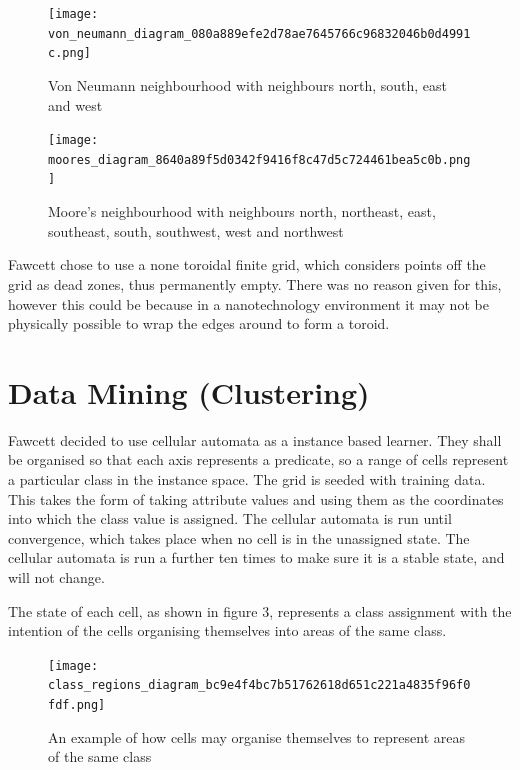 \documentclass[11pt]{article}
\begin{document}
\begin{figure}[htb]
\centering
\texttt{[image: von\_neumann\_diagram\_080a889efe2d78ae7645766c96832046b0d4991c.png]}
\caption{Von Neumann neighbourhood with neighbours north, south, east and west}
\end{figure}


\begin{figure}[htb]
\centering
\texttt{[image: moores\_diagram\_8640a89f5d0342f9416f8c47d5c724461bea5c0b.png]}
\caption{Moore's neighbourhood with neighbours north, northeast, east, southeast, south, southwest, west and northwest}
\end{figure}

Fawcett \cite{fawcett08} chose to use a none toroidal finite grid,
which considers points off the grid as dead zones, thus permanently
empty.  There was no reason given for this, however this could be
because in a nanotechnology environment it may not be physically
possible to wrap the edges around to form a toroid.
\section{Data Mining (Clustering)}
\label{sec-3}


  Fawcett \cite{fawcett08} decided to use cellular automata as a
  instance based learner. They shall be organised so that each axis
  represents a predicate, so a range of cells represent a particular
  class in the instance space.  The grid is seeded with training
  data.  This takes the form of taking attribute values and using them
  as the coordinates into which the class value is assigned.  The
  cellular automata is run until convergence, which takes place when
  no cell is in the unassigned state.  The cellular automata is run a
  further ten times to make sure it is a stable state, and will not
  change.

  The state of each cell, as shown in figure 3, represents a class
  assignment with the intention of the cells organising themselves
  into areas of the same class.

\begin{figure}[htb]
\centering
\texttt{[image: class\_regions\_diagram\_bc9e4f4bc7b51762618d651c221a4835f96f0fdf.png]}
\caption{An example of how cells may organise themselves to represent areas of the same class}
\end{figure}
\end{document}
